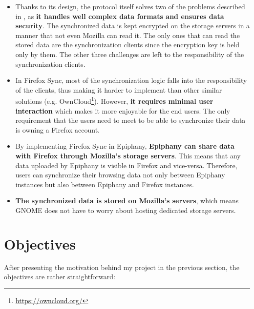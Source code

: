 \begin{itemize}
  \item Thanks to its design, the protocol itself solves two of the problems described in , as \textbf{it handles well complex data formats and ensures data security}. The synchronized data is kept encrypted on the storage servers in a manner that not even Mozilla can read it. The only ones that can read the stored data are the synchronization clients since the encryption key is held only by them. The other three challenges are left to the responsibility of the synchronization clients.

  \item In Firefox Sync, most of the synchronization logic falls into the responsibility of the clients, thus making it harder to implement than other similar solutions (e.g. OwnCloud\footnote{\url{https://owncloud.org/}}). However, \textbf{it requires minimal user interaction} which makes it more enjoyable for the end users. The only requirement that the users need to meet to be able to synchronize their data is owning a Firefox account.

  \item By implementing Firefox Sync in Epiphany, \textbf{Epiphany can share data with Firefox through Mozilla's storage servers}. This means that any data uploaded by Epiphany is visible in Firefox and vice-versa. Therefore, users can synchronize their browsing data not only between Epiphany instances but also between Epiphany and Firefox instances.

  \item \textbf{The synchronized data is stored on Mozilla's servers}, which means GNOME does not have to worry about hosting dedicated storage servers.
\end{itemize}

\section{Objectives}
\label{sec:objectives}

After presenting the motivation behind my project in the previous section, the objectives are rather straightforward:

